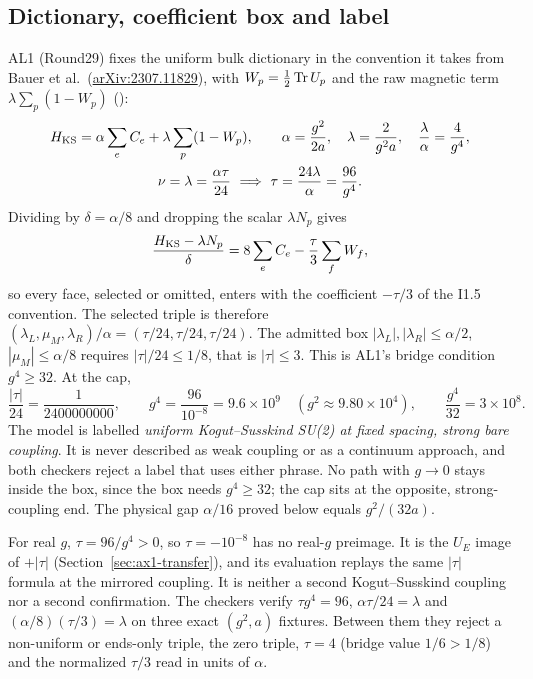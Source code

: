 \subsection{Dictionary, coefficient box and label}
\label{sec:ax1-dictionary}
AL1 (Round29) fixes the uniform bulk dictionary in the convention it takes from
Bauer et al.\ (\href{https://arxiv.org/abs/2307.11829}{arXiv:2307.11829}), with
$W_p=\tfrac12\operatorname{Tr} U_p$ and the raw magnetic term $\lambda\sum_p(1-W_p)$
():
\begin{equation}
 \begin{gathered}
 H_{\rm KS}=\alpha\sum_eC_e+\lambda\sum_p(1-W_p),\qquad
 \alpha=\frac{g^2}{2a},\quad \lambda=\frac2{g^2a},\quad
 \frac\lambda\alpha=\frac4{g^4},\\
 \nu=\lambda=\frac{\alpha\tau}{24}\ \Longrightarrow\ \tau=\frac{24\lambda}\alpha=\frac{96}{g^4}.
 \end{gathered}
 \label{eq:ax1-dictionary}
\end{equation}
Dividing by $\delta=\alpha/8$ and dropping the scalar $\lambda N_p$ gives
\begin{equation}
 \frac{H_{\rm KS}-\lambda N_p}{\delta}=8\sum_eC_e-\frac\tau3\sum_fW_f ,
 \label{eq:ax1-normalized}
\end{equation}
so every face, selected or omitted, enters with the coefficient $-\tau/3$ of
the I1.5 convention. The selected triple is therefore
$(\lambda_L,\mu_M,\lambda_R)/\alpha=(\tau/24,\tau/24,\tau/24)$. The admitted
box $|\lambda_L|,|\lambda_R|\le\alpha/2$, $|\mu_M|\le\alpha/8$ requires
$|\tau|/24\le1/8$, that is $|\tau|\le3$. This is AL1's bridge condition
$g^4\ge32$. At the cap,
\begin{equation}
 \frac{|\tau|}{24}=\frac1{2400000000},\qquad
 g^4=\frac{96}{10^{-8}}=9.6\times10^9\quad(g^2\approx9.80\times10^4),\qquad
 \frac{g^4}{32}=3\times10^8 .
 \label{eq:ax1-box}
\end{equation}
The model is labelled \emph{uniform Kogut--Susskind SU(2) at fixed spacing,
strong bare coupling}. It is never described as weak coupling or as a
continuum approach, and both checkers reject a label that uses either
phrase. No path with $g\to0$ stays inside the box, since the box
needs $g^4\ge32$; the cap sits at the opposite, strong-coupling end. The
physical gap $\alpha/16$ proved below equals $g^2/(32a)$.

For real $g$, $\tau=96/g^4>0$, so $\tau=-10^{-8}$ has no real-$g$ preimage. It
is the $U_E$ image of $+|\tau|$ (Section~\ref{sec:ax1-transfer}), and its
evaluation replays the same $|\tau|$ formula at the mirrored coupling. It is
neither a second Kogut--Susskind coupling nor a second confirmation. The
checkers verify $\tau g^4=96$, $\alpha\tau/24=\lambda$ and
$(\alpha/8)(\tau/3)=\lambda$ on three exact $(g^2,a)$ fixtures. Between them
they reject a non-uniform or ends-only triple, the zero triple, $\tau=4$
(bridge value $1/6>1/8$) and the normalized $\tau/3$ read in units of $\alpha$.

